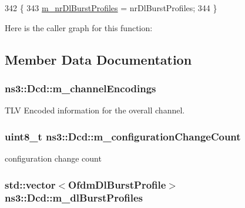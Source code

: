 \begin{DoxyCode}
342 \{
343   \hyperlink{classns3_1_1Dcd_a142e47440278d6e122d2796ede295f8a}{m\_nrDlBurstProfiles} = nrDlBurstProfiles;
344 \}
\end{DoxyCode}


Here is the caller graph for this function\+:




\subsection{Member Data Documentation}
\subsubsection[{\texorpdfstring{m\+\_\+channel\+Encodings}{m_channelEncodings}}]{ ns3\+::\+Dcd\+::m\+\_\+channel\+Encodings\hspace{0.3cm}{\ttfamily [private]}}\hypertarget{classns3_1_1Dcd_a080d5e3e3d2b5f64d74e2bf80f26f7ac}{}\label{classns3_1_1Dcd_a080d5e3e3d2b5f64d74e2bf80f26f7ac}


T\+LV Encoded information for the overall channel. 

\subsubsection[{\texorpdfstring{m\+\_\+configuration\+Change\+Count}{m_configurationChangeCount}}]{\setlength{\rightskip}{0pt plus 5cm}uint8\+\_\+t ns3\+::\+Dcd\+::m\+\_\+configuration\+Change\+Count\hspace{0.3cm}{\ttfamily [private]}}\hypertarget{classns3_1_1Dcd_a36fd01a4f55946d068fc1ae02a0b236f}{}\label{classns3_1_1Dcd_a36fd01a4f55946d068fc1ae02a0b236f}


configuration change count 

\subsubsection[{\texorpdfstring{m\+\_\+dl\+Burst\+Profiles}{m_dlBurstProfiles}}]{\setlength{\rightskip}{0pt plus 5cm}std\+::vector$<${\bf Ofdm\+Dl\+Burst\+Profile}$>$ ns3\+::\+Dcd\+::m\+\_\+dl\+Burst\+Profiles\hspace{0.3cm}{\ttfamily [private]}}\hypertarget{classns3_1_1Dcd_af67f6168018932059fd2cd5f6605db8d}{}\label{classns3_1_1Dcd_af67f6168018932059fd2cd5f6605db8d}


